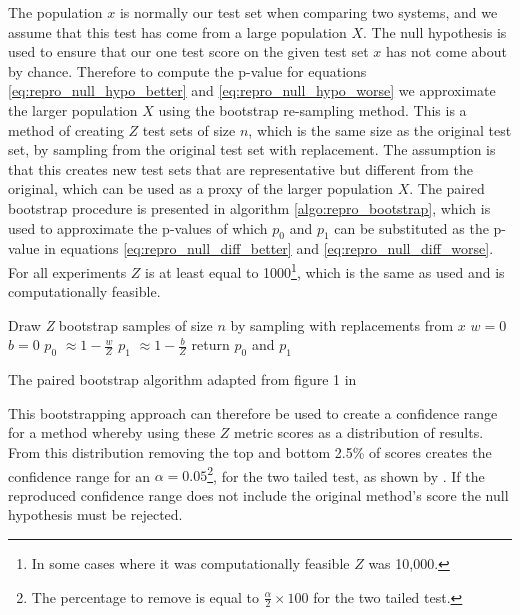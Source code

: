 The population $x$ is normally our test set when comparing two systems, and we assume that this test has come from a large population $X$. The null hypothesis is used to ensure that our one test score on the given test set $x$ has not come about by chance. Therefore to compute the p-value for equations \ref{eq:repro_null_hypo_better} and \ref{eq:repro_null_hypo_worse} we approximate the larger population $X$ using the bootstrap re-sampling method. This is a method of creating $Z$ test sets of size $n$, which is the same size as the original test set, by sampling from the original test set with replacement. The assumption is that this creates new test sets that are representative but different from the original, which can be used as a proxy of the larger population $X$. The paired bootstrap procedure is presented in algorithm \ref{algo:repro_bootstrap}, which is used to approximate the p-values of which $p_0$ and $p_1$ can be substituted as the p-value in equations \ref{eq:repro_null_diff_better} and \ref{eq:repro_null_diff_worse}. For all experiments $Z$ is at least equal to 1000\footnote{In some cases where it was computationally feasible $Z$ was 10,000.}, which is the same as \citet{koehn-2004-statistical} used and is computationally feasible. 

\begin{algorithm}
    Draw \textit{Z} bootstrap samples of size $n$ by sampling with replacements from $x$\;
    $w = 0$\;
    $b = 0$\;
    $p_0$ $\approx 1 - \frac{w}{Z}$\;
    $p_1$ $\approx 1 - \frac{b}{Z}$\;
    return $p_0$ and $p_1$\;
    \caption{The paired bootstrap algorithm adapted from figure 1 in \citet{berg-kirkpatrick-etal-2012-empirical}}
    \label{algo:repro_bootstrap}
\end{algorithm}

This bootstrapping approach can therefore be used to create a confidence range for a method whereby using these $Z$ metric scores as a distribution of results. From this distribution removing the top and bottom 2.5\% of scores creates the confidence range for an $\alpha=0.05$\footnote{The percentage to remove is equal to $\frac{\alpha}{2} \times 100$ for the two tailed test.}, for the two tailed test, as shown by \citet{koehn-2004-statistical}. If the reproduced confidence range does not include the original method's score the null hypothesis must be rejected. 

